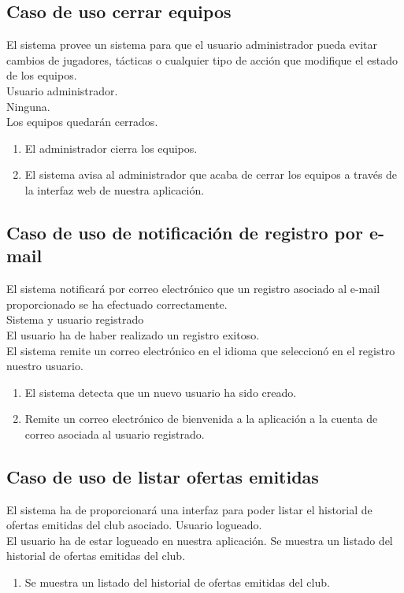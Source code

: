 \subsection{Caso de uso cerrar equipos}
 El sistema provee un sistema para que el
usuario administrador pueda evitar cambios de jugadores, tácticas o
cualquier tipo de acción que modifique el estado de los equipos.\\
 Usuario administrador. \\
 Ninguna. \\
 Los equipos quedarán cerrados. \\
\begin{enumerate}
  \item El administrador cierra los equipos.
  \item El sistema avisa al administrador que acaba de cerrar los
    equipos a través de la interfaz web de nuestra aplicación.
\end{enumerate}

\subsection{Caso de uso de notificación de registro por e-mail}
 El sistema notificará por correo electrónico
que un registro asociado al e-mail proporcionado se ha efectuado correctamente.\\
 Sistema y usuario registrado \\
 El usuario ha de haber realizado un registro exitoso. \\
 El sistema remite un correo electrónico en
el idioma que seleccionó en el registro nuestro usuario. \\
\begin{enumerate}
  \item El sistema detecta que un nuevo usuario ha sido creado.
  \item Remite un correo electrónico de bienvenida a la aplicación a
    la cuenta de correo asociada al usuario registrado.
\end{enumerate}

\subsection{Caso de uso de listar ofertas emitidas}
 El sistema ha de proporcionará una interfaz
para poder listar el historial de ofertas emitidas del club asociado.
 Usuario logueado. \\
 El usuario ha de estar logueado en
nuestra aplicación.
 Se muestra un listado del historial de
ofertas emitidas del club.
\begin{enumerate}
  \item Se muestra un listado del historial de ofertas emitidas del club.
\end{enumerate}

